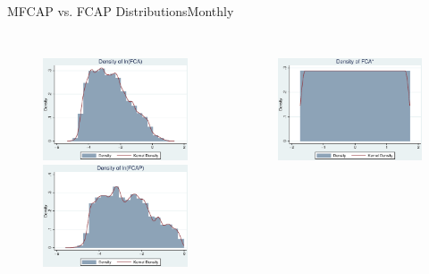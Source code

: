 \documentclass{beamer}
\begin{document}
\begin{frame}{MFCAP vs. FCAP Distributions}{Monthly}
\begin{columns}
\begin{figure}
						\includegraphics[width=\linewidth]{"MHistlnFCA.eps"}\\
						\includegraphics[width=\linewidth]{"MHistlnFCAP.eps"}
					\end{figure}
				\pause
					\begin{figure}   
						\centering
						\includegraphics[width=\linewidth]{"MHistNFCA.eps"}  \\

\end{figure}
\end{columns}
\end{frame}
\end{document}
